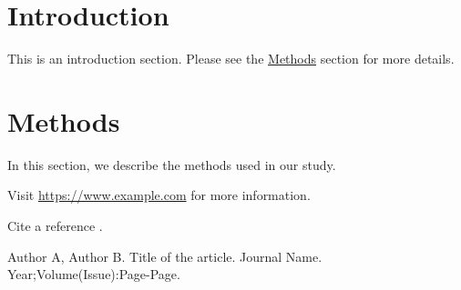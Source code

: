 \documentclass{article}
\begin{document}
\section{Introduction}\label{sec:intro}
This is an introduction section. Please see the \hyperref[sec:methods]{Methods} section for more details.

\section{Methods}\label{sec:methods}
In this section, we describe the methods used in our study.

Visit \url{https://www.example.com} for more information.

Cite a reference \cite{sample-reference}.

\begin{thebibliography}{9}
 Author A, Author B. Title of the article. Journal Name. Year;Volume(Issue):Page-Page.
\end{thebibliography}
\end{document}
